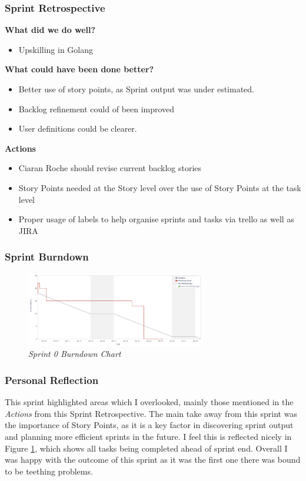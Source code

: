 \subsubsection{Sprint Retrospective}
\textbf{What did we do well?}
\begin{itemize}
    \item Upskilling in Golang
\end{itemize}
\textbf{What could have been done better?}
\begin{itemize}
    \item Better use of story points, as Sprint output was under estimated.
    \item Backlog refinement could of been improved
    \item User definitions could be clearer.
\end{itemize}
\textbf{Actions}
\begin{itemize}
    \item Ciaran Roche should revise current backlog stories
    \item Story Points needed at the Story level over the use of Story Points at the task level
    \item Proper usage of labels to help organise sprints and tasks via trello as well as JIRA
\end{itemize}

\subsubsection{Sprint Burndown}
\begin{figure}[!hb]
\centering
\includegraphics*[width=0.7\textwidth]{images/burndown-sprint-1.png}
\caption{\em Sprint 0 Burndown Chart}
\label{img:bd1}
\end{figure}

\subsubsection{Personal Reflection}
This sprint highlighted areas which I overlooked, mainly those mentioned in the \textit{Actions} from this Sprint Retrospective. The main take away from this sprint was the importance of Story Points, as it is a key factor in discovering sprint output and planning more efficient sprints in the future. I feel this is reflected nicely in Figure \ref{img:bd1}, which shows all tasks being completed ahead of sprint end. Overall I was happy with the outcome of this sprint as it was the first one there was bound to be teething problems.

